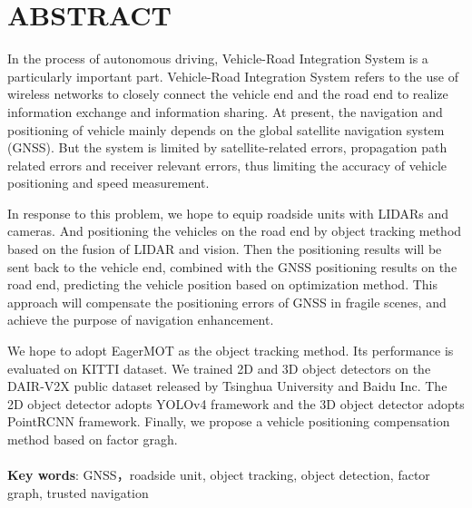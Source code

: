 \newpage
{}
\setmainfont{Arial}
\section*{ABSTRACT}
\setmainfont{TeX Gyre Termes}

In the process of autonomous driving, Vehicle-Road Integration System is a particularly important part. Vehicle-Road Integration System refers to the use of wireless networks to closely connect the vehicle end and the road end to realize information exchange and information sharing. At present, the navigation and positioning of vehicle mainly depends on the global satellite navigation system (GNSS). But the system is limited by satellite-related errors, propagation path related errors and receiver relevant errors, thus limiting the accuracy of vehicle positioning and speed measurement.

In response to this problem, we hope to equip roadside units with LIDARs and cameras. And positioning the vehicles on the road end by object tracking method based on the fusion of  
LIDAR and vision. Then the positioning results will be sent back to the vehicle end, combined with the GNSS positioning results on the road end, predicting the vehicle position based on optimization method. This approach will compensate the positioning errors of GNSS in fragile scenes, and achieve the purpose of navigation enhancement.

We hope to adopt EagerMOT as the object tracking method. Its performance is evaluated on KITTI dataset. We trained 2D and 3D object detectors on the DAIR-V2X public dataset released by Tsinghua University and Baidu Inc. The 2D object detector adopts YOLOv4 framework and the 3D object detector adopts PointRCNN framework. Finally, we propose a vehicle positioning compensation method based on factor gragh.\\
~\\ 
\textbf{Key words}: GNSS，roadside unit, object tracking, object detection, factor graph, trusted navigation
